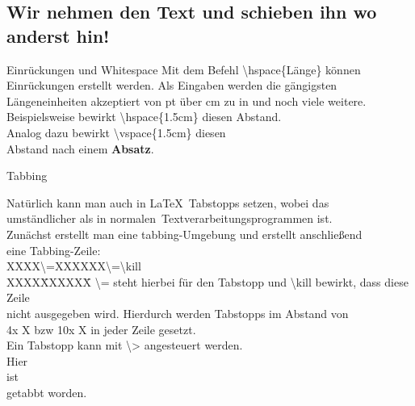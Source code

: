 \subsection{Wir nehmen den Text und schieben ihn wo anderst hin!}
\begin{frame}{Einr\"uckungen und Whitespace}
    Mit dem Befehl \color{cturkis}\textbackslash hspace\color{black}\{\color{corange}L\"ange\color{black}\} k\"onnen Einr\"uckungen erstellt werden. Als Eingaben werden die g\"angigsten L\"angeneinheiten akzeptiert von \color{corange}pt \color{black} \"uber  \color{corange}cm \color{black} zu \color{corange}in \color{black} und noch viele weitere. Beispielsweise bewirkt \color{cturkis}\textbackslash hspace\{\color{corange}1.5cm\color{black}\} diesen \hspace{1.5cm} Abstand.\\
    Analog dazu bewirkt \color{cturkis}\textbackslash vspace\color{black}\{\color{corange}1.5cm\color{black}\} diesen \\\vspace{1.5cm} Abstand nach einem \textbf{Absatz}.
\end{frame}
\begin{frame}{Tabbing}
    \begin{tabbing}
    Nat\"urlich kann man auch in \LaTeX~Tabstopps setzen, wobei das \\umst\"andlicher als in \glqq normalen\grqq~Textverarbeitungsprogrammen ist.\\
    Zun\"achst erstellt man eine \color{cpurple}tabbing\color{black}-Umgebung und erstellt anschlie{\ss}end \\eine Tabbing-Zeile:\\\vspace{1.5mm}
    XXXX\color{cred}\textbackslash=\color{black}XXXXXX\color{cred}\textbackslash=\textbackslash kill\color{black}\\
    XXXX\=XXXXXX\=\kill
    \color{cred}\textbackslash= \color{black} steht hierbei f\"ur den Tabstopp und \color{cred}\textbackslash kill \color{black} bewirkt, dass diese Zeile \\nicht ausgegeben wird.
    Hierdurch werden Tabstopps im Abstand von \\4x X bzw 10x X in jeder Zeile gesetzt. \\
    Ein Tabstopp kann mit \color{cred}\textbackslash> \color{black}angesteuert werden.\\
    Hier\\
    \>ist\\
    \>\>getabbt worden.
    \end{tabbing}
\end{frame}
